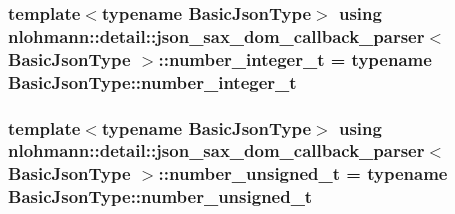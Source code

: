 \subsubsection[{\texorpdfstring{number\+\_\+integer\+\_\+t}{number_integer_t}}]{\setlength{\rightskip}{0pt plus 5cm}template$<$typename Basic\+Json\+Type$>$ using {\bf nlohmann\+::detail\+::json\+\_\+sax\+\_\+dom\+\_\+callback\+\_\+parser}$<$ Basic\+Json\+Type $>$\+::{\bf number\+\_\+integer\+\_\+t} =  typename Basic\+Json\+Type\+::number\+\_\+integer\+\_\+t}\hypertarget{classnlohmann_1_1detail_1_1json__sax__dom__callback__parser_a3ba8fc7a8d83c5b0eeb3b543ad844b8d}{}\label{classnlohmann_1_1detail_1_1json__sax__dom__callback__parser_a3ba8fc7a8d83c5b0eeb3b543ad844b8d}
\subsubsection[{\texorpdfstring{number\+\_\+unsigned\+\_\+t}{number_unsigned_t}}]{\setlength{\rightskip}{0pt plus 5cm}template$<$typename Basic\+Json\+Type$>$ using {\bf nlohmann\+::detail\+::json\+\_\+sax\+\_\+dom\+\_\+callback\+\_\+parser}$<$ Basic\+Json\+Type $>$\+::{\bf number\+\_\+unsigned\+\_\+t} =  typename Basic\+Json\+Type\+::number\+\_\+unsigned\+\_\+t}\hypertarget{classnlohmann_1_1detail_1_1json__sax__dom__callback__parser_a2406c5125f7128fb9c01921df2903001}{}\label{classnlohmann_1_1detail_1_1json__sax__dom__callback__parser_a2406c5125f7128fb9c01921df2903001}
